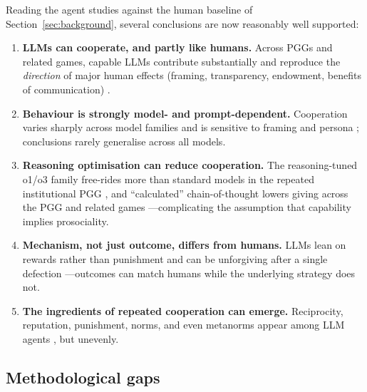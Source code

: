 \documentclass[11pt,a4paper]{article}
\begin{document}
Reading the agent studies against the human baseline of
Section~\ref{sec:background}, several conclusions are now reasonably well
supported:
\begin{enumerate}
  \item \textbf{LLMs can cooperate, and partly like humans.} Across PGGs and
  related games, capable LLMs contribute substantially and reproduce the
  \emph{direction} of major human effects (framing, transparency, endowment,
  benefits of communication) \citep{sreedhar2025simulating,mei2024turing,
  piatti2024govsim}.
  \item \textbf{Behaviour is strongly model- and prompt-dependent.} Cooperation
  varies sharply across model families and is sensitive to framing and persona
  \citep{fontana2025nicer,lore2024strategic,vallinder2024cultural}; conclusions
  rarely generalise across all models.
  \item \textbf{Reasoning optimisation can reduce cooperation.} The
  reasoning-tuned o1/o3 family free-rides more than standard models in the
  repeated institutional PGG \citep{guzman2025corrupted}, and ``calculated''
  chain-of-thought lowers giving across the PGG and related games
  \citep{li2025spontaneous,backmann2025moralsim}---complicating the assumption that
  capability implies prosociality.
  \item \textbf{Mechanism, not just outcome, differs from humans.} LLMs lean on
  rewards rather than punishment \citep{guzman2025corrupted} and can be
  unforgiving after a single defection \citep{akata2025playing}---outcomes can
  match humans while the underlying strategy does not.
  \item \textbf{The ingredients of repeated cooperation can emerge.}
  Reciprocity, reputation, punishment, norms, and even metanorms appear among LLM
  agents \citep{horiguchi2024evolution,vallinder2024cultural,ashery2025emergent},
  but unevenly.
\end{enumerate}

\subsection{Methodological gaps}
\end{document}
